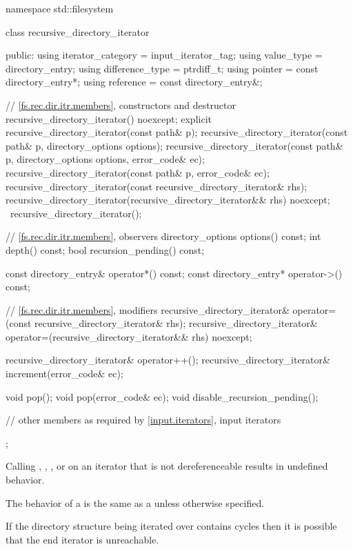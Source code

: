 \begin{codeblock}
namespace std::filesystem {
  class recursive_directory_iterator {
  public:
    using iterator_category = input_iterator_tag;
    using value_type        = directory_entry;
    using difference_type   = ptrdiff_t;
    using pointer           = const directory_entry*;
    using reference         = const directory_entry&;

    // \ref{fs.rec.dir.itr.members}, constructors and destructor
    recursive_directory_iterator() noexcept;
    explicit recursive_directory_iterator(const path& p);
    recursive_directory_iterator(const path& p, directory_options options);
    recursive_directory_iterator(const path& p, directory_options options,
                                 error_code& ec);
    recursive_directory_iterator(const path& p, error_code& ec);
    recursive_directory_iterator(const recursive_directory_iterator& rhs);
    recursive_directory_iterator(recursive_directory_iterator&& rhs) noexcept;
    ~recursive_directory_iterator();

    // \ref{fs.rec.dir.itr.members}, observers
    directory_options  options() const;
    int                depth() const;
    bool               recursion_pending() const;

    const directory_entry& operator*() const;
    const directory_entry* operator->() const;

    // \ref{fs.rec.dir.itr.members}, modifiers
    recursive_directory_iterator&
      operator=(const recursive_directory_iterator& rhs);
    recursive_directory_iterator&
      operator=(recursive_directory_iterator&& rhs) noexcept;

    recursive_directory_iterator& operator++();
    recursive_directory_iterator& increment(error_code& ec);

    void pop();
    void pop(error_code& ec);
    void disable_recursion_pending();

    // other members as required by \ref{input.iterators}, input iterators
  };
}
\end{codeblock}

\pnum
Calling , , ,
 or 
on an iterator that is not dereferenceable results in undefined behavior.

\pnum
The behavior of a  is the same
as a  unless otherwise specified.

\pnum
\begin{note}
If the directory structure being iterated over contains cycles
then it is possible that the end iterator is unreachable.
\end{note}

